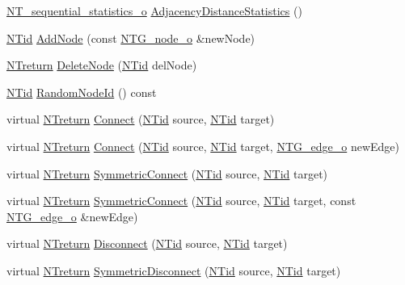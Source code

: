 \begin{DoxyCompactItemize}
\item 
\hyperlink{class_n_t__sequential__statistics__o}{NT\_\-sequential\_\-statistics\_\-o} \hyperlink{class_n_t_g__graph__o_a2676da7a5c5fa96c51a6bef58e5c1da7}{AdjacencyDistanceStatistics} ()
\item 
\hyperlink{nt__types_8h_ab5cab5f78fdd2211c340cbe527a4afd7}{NTid} \hyperlink{class_n_t_g__graph__o_af12352b95b97a88548e6099cde9dde0a}{AddNode} (const \hyperlink{class_n_t_g__node__o}{NTG\_\-node\_\-o} \&newNode)
\item 
\hyperlink{nt__types_8h_ab9564ee8f091e809d21b8451c6683c53}{NTreturn} \hyperlink{class_n_t_g__graph__o_a1458735b2a72193a715e2eaaab039c47}{DeleteNode} (\hyperlink{nt__types_8h_ab5cab5f78fdd2211c340cbe527a4afd7}{NTid} delNode)
\item 
\hyperlink{nt__types_8h_ab5cab5f78fdd2211c340cbe527a4afd7}{NTid} \hyperlink{class_n_t_g__graph__o_a5c0950327267744949ba8dc033da76e5}{RandomNodeId} () const 
\item 
virtual \hyperlink{nt__types_8h_ab9564ee8f091e809d21b8451c6683c53}{NTreturn} \hyperlink{class_n_t_g__graph__o_a64606b6fdc0e941eec77987dae97a137}{Connect} (\hyperlink{nt__types_8h_ab5cab5f78fdd2211c340cbe527a4afd7}{NTid} source, \hyperlink{nt__types_8h_ab5cab5f78fdd2211c340cbe527a4afd7}{NTid} target)
\item 
virtual \hyperlink{nt__types_8h_ab9564ee8f091e809d21b8451c6683c53}{NTreturn} \hyperlink{class_n_t_g__graph__o_aeaa8ffabe0e964dd98f994b6c2772d88}{Connect} (\hyperlink{nt__types_8h_ab5cab5f78fdd2211c340cbe527a4afd7}{NTid} source, \hyperlink{nt__types_8h_ab5cab5f78fdd2211c340cbe527a4afd7}{NTid} target, \hyperlink{class_n_t_g__edge__o}{NTG\_\-edge\_\-o} newEdge)
\item 
virtual \hyperlink{nt__types_8h_ab9564ee8f091e809d21b8451c6683c53}{NTreturn} \hyperlink{class_n_t_g__graph__o_a16c570d8a0534664bca09a2a8ede41c1}{SymmetricConnect} (\hyperlink{nt__types_8h_ab5cab5f78fdd2211c340cbe527a4afd7}{NTid} source, \hyperlink{nt__types_8h_ab5cab5f78fdd2211c340cbe527a4afd7}{NTid} target)
\item 
virtual \hyperlink{nt__types_8h_ab9564ee8f091e809d21b8451c6683c53}{NTreturn} \hyperlink{class_n_t_g__graph__o_a7ac82a7a4f1d41771775dcd0f935f979}{SymmetricConnect} (\hyperlink{nt__types_8h_ab5cab5f78fdd2211c340cbe527a4afd7}{NTid} source, \hyperlink{nt__types_8h_ab5cab5f78fdd2211c340cbe527a4afd7}{NTid} target, const \hyperlink{class_n_t_g__edge__o}{NTG\_\-edge\_\-o} \&newEdge)
\item 
virtual \hyperlink{nt__types_8h_ab9564ee8f091e809d21b8451c6683c53}{NTreturn} \hyperlink{class_n_t_g__graph__o_a6e3bcd73de258454ecce1ef3ec8ad8c8}{Disconnect} (\hyperlink{nt__types_8h_ab5cab5f78fdd2211c340cbe527a4afd7}{NTid} source, \hyperlink{nt__types_8h_ab5cab5f78fdd2211c340cbe527a4afd7}{NTid} target)
\item 
virtual \hyperlink{nt__types_8h_ab9564ee8f091e809d21b8451c6683c53}{NTreturn} \hyperlink{class_n_t_g__graph__o_a9429cffb02df861dcab2246ef4687b5d}{SymmetricDisconnect} (\hyperlink{nt__types_8h_ab5cab5f78fdd2211c340cbe527a4afd7}{NTid} source, \hyperlink{nt__types_8h_ab5cab5f78fdd2211c340cbe527a4afd7}{NTid} target)
\end{DoxyCompactItemize}
